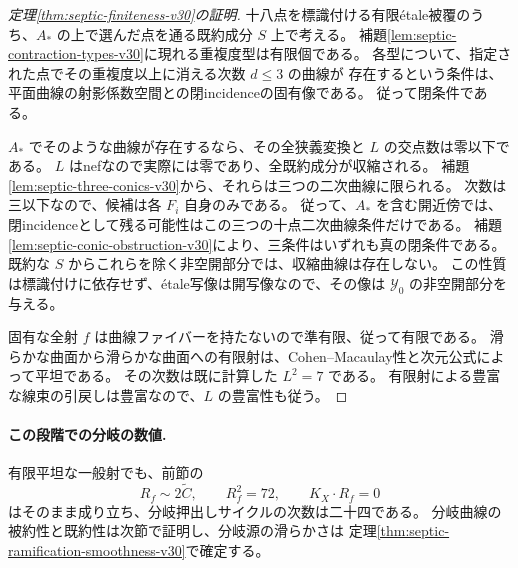 \begin{proof}[定理\ref{thm:septic-finiteness-v30}の証明]
十八点を標識付ける有限\'etale被覆のうち、$A_*$ の上で選んだ点を通る既約成分 $S$ 上で考える。
補題\ref{lem:septic-contraction-types-v30}に現れる重複度型は有限個である。
各型について、指定された点でその重複度以上に消える次数 $d\le3$ の曲線が
存在するという条件は、平面曲線の射影係数空間との閉incidenceの固有像である。
従って閉条件である。

$A_*$ でそのような曲線が存在するなら、その全狭義変換と $L$ の交点数は零以下である。
$L$ はnefなので実際には零であり、全既約成分が収縮される。
補題\ref{lem:septic-three-conics-v30}から、それらは三つの二次曲線に限られる。
次数は三以下なので、候補は各 $F_i$ 自身のみである。
従って、$A_*$ を含む開近傍では、閉incidenceとして残る可能性はこの三つの十点二次曲線条件だけである。
補題\ref{lem:septic-conic-obstruction-v30}により、三条件はいずれも真の閉条件である。
既約な $S$ からこれらを除く非空開部分では、収縮曲線は存在しない。
この性質は標識付けに依存せず、\'etale写像は開写像なので、その像は $\mathcal Y_0$ の非空開部分を与える。

固有な全射 $f$ は曲線ファイバーを持たないので準有限、従って有限である。
滑らかな曲面から滑らかな曲面への有限射は、Cohen--Macaulay性と次元公式によって平坦である。
その次数は既に計算した $L^2=7$ である。
有限射による豊富な線束の引戻しは豊富なので、$L$ の豊富性も従う。
\end{proof}

\paragraph{この段階での分岐の数値.}
有限平坦な一般射でも、前節の
\[
 R_f\sim2\widetilde C,\qquad R_f^2=72,\qquad K_X\cdot R_f=0
\]
はそのまま成り立ち、分岐押出しサイクルの次数は二十四である。
分岐曲線の被約性と既約性は次節で証明し、分岐源の滑らかさは
定理\ref{thm:septic-ramification-smoothness-v30}で確定する。
